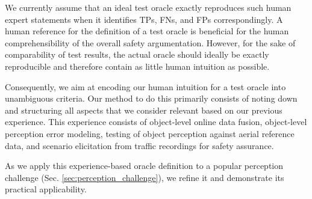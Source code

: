 \documentclass[conference]{IEEEtran}
\begin{document}
We currently assume that an ideal test oracle exactly reproduces such human expert statements when it identifies TPs, FNs, and FPs correspondingly.
A human reference for the definition of a test oracle is beneficial for the human comprehensibility of the overall safety argumentation. 
However, for the sake of comparability of test results, the actual oracle should ideally be exactly reproducible and therefore contain as little human intuition as possible. 

Consequently, we aim at encoding our human intuition for a test oracle into unambiguous criteria. 
Our method to do this primarily consists of noting down and structuring all aspects that we consider relevant based on our previous experience. 
This experience consists of object-level online data fusion, object-level perception error modeling, testing of object perception against aerial reference data, and scenario elicitation from traffic recordings for safety assurance. 


As we apply this experience-based oracle definition to a popular perception challenge (Sec. \ref{sec:perception_challenge}), we refine it and demonstrate its practical applicability. 












  
\end{document}
